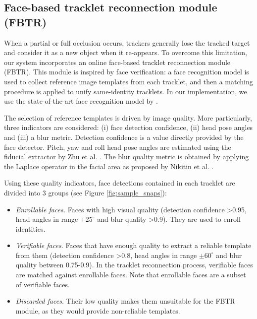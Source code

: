 \subsection{Face-based tracklet reconnection module (FBTR)}
\label{sec:reID}

When a partial or full occlusion occurs, trackers generally lose the tracked target and consider it as a new object when it re-appears. To overcome this limitation, our system incorporates an online face-based tracklet reconnection module (FBTR). This module is inspired by face verification: a face recognition model is used to collect reference image templates from each tracklet, and then a matching procedure is applied to unify same-identity tracklets. In our implementation, we use the state-of-the-art face recognition model by \cite{deng2019arcface}.

The selection of reference templates is driven by image quality. More particularly, three indicators are considered: (i) face detection confidence, (ii) head pose angles and (iii) a blur metric.
Detection confidence is a value directly provided by the face detector. Pitch, yaw and roll head pose angles are estimated using the fiducial extractor by Zhu et al. \cite{zhu20173ddfa}. The blur quality metric is obtained by applying the Laplace operator in the facial area as proposed by Nikitin et al. \cite{nikitin2014facequality}.

Using these quality indicators, face detections contained in each tracklet are divided into 3 groups (see Figure \ref{fig:sample_snaps}):

\begin{itemize}
\item \textit{Enrollable faces.} Faces with high visual quality (detection confidence \textgreater0.95, head angles in range $\pm25^{\circ}$ and blur quality \textgreater0.9). They are used to enroll identities.
\item \textit{Verifiable faces.} Faces that have enough quality to extract a reliable template from them (detection confidence \textgreater0.8, head angles in range $\pm60^\circ$ and blur quality between 0.75-0.9). In the tracklet reconnection process, verifiable faces are matched against enrollable faces. Note that enrollable faces are a subset of verifiable faces.
\item \textit{Discarded faces.} Their low quality makes them unsuitable for the FBTR module, as they would provide non-reliable templates.
\end{itemize}

